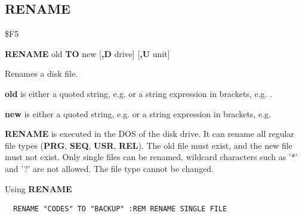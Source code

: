 \subsection{RENAME}
\begin{description}[leftmargin=2cm,style=nextline]
\item [Token:] \$F5
\item [Format:] {\bf RENAME} old {\bf TO} new [{\bf,D} drive] [{\bf,U} unit]
\item [Usage:] Renames a disk file.

   {\bf old} is either a quoted string, e.g.  or
   a string expression in brackets, e.g. .

   {\bf new} is either a quoted string, e.g.  or
   a string expression in brackets, e.g. 

   \drivedefinition

   \unitdefinition

\item [Remarks:]
   {\bf RENAME} is executed in the DOS of the disk drive.
   It can rename all regular file types ({\bf PRG}, {\bf SEQ}, {\bf USR}, {\bf REL}).
   The old file must exist, and the new file must not exist.
   Only single files can be renamed, wildcard characters such as
   '*' and '?' are not allowed. The file type cannot be changed.

\item [Example:] Using {\bf RENAME}
\begin{tcolorbox}[colback=black,coltext=white]
\verbatimfont{\codefont}
\begin{verbatim}
  RENAME "CODES" TO "BACKUP" :REM RENAME SINGLE FILE
\end{verbatim}
\end{tcolorbox}
\end{description}


\newpage
